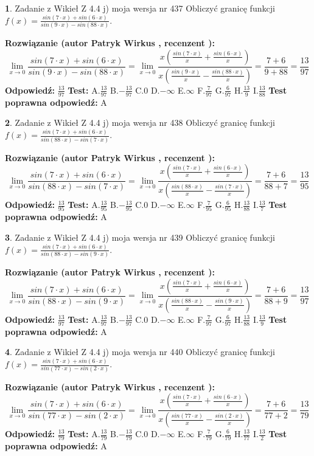 \documentclass[12pt, a4paper]{article}
\theoremstyle{definition} %
\newtheorem{zad}{}
\newcommand{\zadStart}[1]{\begin{zad}#1\newline}
\newcommand{\zadStop}{\end{zad}}
\newcommand{\rozwStart}[2]{\noindent \textbf{Rozwiązanie (autor #1 , recenzent #2): }\newline}
\newcommand{\rozwStop}{\newline}
\newcommand{\odpStart}{\noindent \textbf{Odpowiedź:}\newline}
\newcommand{\odpStop}{\newline}
\newcommand{\testStart}{\noindent \textbf{Test:}\newline}
\newcommand{\testStop}{\newline}
\newcommand{\kluczStart}{\noindent \textbf{Test poprawna odpowiedź:}\newline}
\newcommand{\kluczStop}{\newline}
\begin{document}
\zadStart{Zadanie z Wikieł Z 4.4 j) moja wersja nr 437}
Obliczyć granicę funkcji $f(x)=\frac{sin(7\cdot x) +sin(6\cdot x)}{sin(9\cdot x) -sin(88\cdot x)}$.
\zadStop
\rozwStart{Patryk Wirkus}{}
$$\lim\limits_{x\to 0}\frac{sin(7\cdot x) +sin(6\cdot x)}{sin(9\cdot x) -sin(88\cdot x)}=\lim\limits_{x\to 0}\frac{x(\frac{sin(7\cdot x)}{x}+\frac{sin(6\cdot x)}{x})}{x(\frac{sin(9\cdot x)}{x}-\frac{sin(88\cdot x)}{x})}=\frac{7+6}{9+88} = \frac{13}{97}$$
\rozwStop
\odpStart
$\frac{13}{97}$
\odpStop
\testStart
A.$\frac{13}{97}$
B.$-\frac{13}{97}$
C.$0$
D.$-\infty$
E.$\infty$
F.$\frac{7}{97}$
G.$\frac{6}{97}$
H.$\frac{13}{9}$
I.$\frac{13}{88}$
\testStop
\kluczStart
A
\kluczStop



\zadStart{Zadanie z Wikieł Z 4.4 j) moja wersja nr 438}
Obliczyć granicę funkcji $f(x)=\frac{sin(7\cdot x) +sin(6\cdot x)}{sin(88\cdot x) -sin(7\cdot x)}$.
\zadStop
\rozwStart{Patryk Wirkus}{}
$$\lim\limits_{x\to 0}\frac{sin(7\cdot x) +sin(6\cdot x)}{sin(88\cdot x) -sin(7\cdot x)}=\lim\limits_{x\to 0}\frac{x(\frac{sin(7\cdot x)}{x}+\frac{sin(6\cdot x)}{x})}{x(\frac{sin(88\cdot x)}{x}-\frac{sin(7\cdot x)}{x})}=\frac{7+6}{88+7} = \frac{13}{95}$$
\rozwStop
\odpStart
$\frac{13}{95}$
\odpStop
\testStart
A.$\frac{13}{95}$
B.$-\frac{13}{95}$
C.$0$
D.$-\infty$
E.$\infty$
F.$\frac{7}{95}$
G.$\frac{6}{95}$
H.$\frac{13}{88}$
I.$\frac{13}{7}$
\testStop
\kluczStart
A
\kluczStop



\zadStart{Zadanie z Wikieł Z 4.4 j) moja wersja nr 439}
Obliczyć granicę funkcji $f(x)=\frac{sin(7\cdot x) +sin(6\cdot x)}{sin(88\cdot x) -sin(9\cdot x)}$.
\zadStop
\rozwStart{Patryk Wirkus}{}
$$\lim\limits_{x\to 0}\frac{sin(7\cdot x) +sin(6\cdot x)}{sin(88\cdot x) -sin(9\cdot x)}=\lim\limits_{x\to 0}\frac{x(\frac{sin(7\cdot x)}{x}+\frac{sin(6\cdot x)}{x})}{x(\frac{sin(88\cdot x)}{x}-\frac{sin(9\cdot x)}{x})}=\frac{7+6}{88+9} = \frac{13}{97}$$
\rozwStop
\odpStart
$\frac{13}{97}$
\odpStop
\testStart
A.$\frac{13}{97}$
B.$-\frac{13}{97}$
C.$0$
D.$-\infty$
E.$\infty$
F.$\frac{7}{97}$
G.$\frac{6}{97}$
H.$\frac{13}{88}$
I.$\frac{13}{9}$
\testStop
\kluczStart
A
\kluczStop



\zadStart{Zadanie z Wikieł Z 4.4 j) moja wersja nr 440}
Obliczyć granicę funkcji $f(x)=\frac{sin(7\cdot x) +sin(6\cdot x)}{sin(77\cdot x) -sin(2\cdot x)}$.
\zadStop
\rozwStart{Patryk Wirkus}{}
$$\lim\limits_{x\to 0}\frac{sin(7\cdot x) +sin(6\cdot x)}{sin(77\cdot x) -sin(2\cdot x)}=\lim\limits_{x\to 0}\frac{x(\frac{sin(7\cdot x)}{x}+\frac{sin(6\cdot x)}{x})}{x(\frac{sin(77\cdot x)}{x}-\frac{sin(2\cdot x)}{x})}=\frac{7+6}{77+2} = \frac{13}{79}$$
\rozwStop
\odpStart
$\frac{13}{79}$
\odpStop
\testStart
A.$\frac{13}{79}$
B.$-\frac{13}{79}$
C.$0$
D.$-\infty$
E.$\infty$
F.$\frac{7}{79}$
G.$\frac{6}{79}$
H.$\frac{13}{77}$
I.$\frac{13}{2}$
\testStop
\kluczStart
A
\kluczStop
\end{document}

